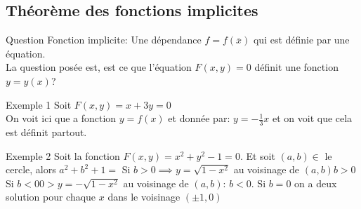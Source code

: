 \subsection{Théorème des fonctions implicites}
\begin{parag}{Question}
    Fonction implicite: Une dépendance $f = f\left(\overline{x}\right)$ qui est définie par une équation.\\
   La question posée est, est ce que l'équation $F\left(x, y\right) = 0$ définit une fonction $y = y\left(x\right)$? 
   \begin{subparag}{Exemple 1}
        Soit $F\left(x, y\right) = x + 3y = 0$\\
        On voit ici que a fonction $y = f\left(x\right)$ et donnée par: $y = - \frac{1}{3}x$ et on voit que cela est définit partout.
   \end{subparag}
   \begin{subparag}{Exemple 2}
       Soit la fonction $F\left(x, y\right) = x^2 + y^2 - 1 = 0$. Et soit $\left(a, b\right) \in$ le cercle, alors $a^2 + b^2 + 1 = $
       Si $b > 0 \implies y = \sqrt{1 - x^2}$ au voisinage de $\left(a, b\right)b > 0$\\
       Si $b < 0 0> y = -\sqrt{1-x^2}$ au voisinage de $\left(a, b\right)$:  $b < 0$.
       Si $b = 0$ on a deux solution pour chaque $x$ dans le voisinage $\left(\pm 1, 0\right)$
   \end{subparag}
    
\end{parag}


